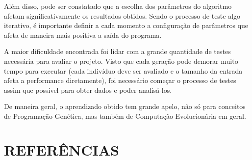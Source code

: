 \documentclass[12pt]{article}
\begin{document}
Além disso, pode ser constatado que a escolha dos parâmetros do algoritmo afetam significativamente
os resultados obtidos. Sendo o processo de teste algo iterativo, é importante definir a cada
momento a configuração de parâmetros que afeta de maneira mais positiva a saída do programa.

A maior dificuldade encontrada foi lidar com a grande quantidade de testes necessária para
avaliar o projeto. Visto que cada geração pode demorar muito tempo para executar (cada indivíduo
deve ser avaliado e o tamanho da entrada afeta a performance diretamente), foi necessário começar
o processo de testes assim que possível para obter dados e poder analisá-los.

De maneira geral, o aprendizado obtido tem grande apelo, não só para conceitos de Programação Genética,
mas também de Computação Evolucionária em geral.

\section{REFERÊNCIAS}



\end{document}
